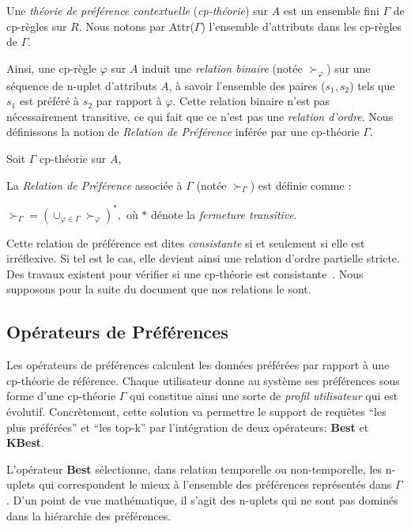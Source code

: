 Une \textit{théorie de préférence contextuelle} (\textit{cp-théorie}) sur $A$ est un ensemble fini $\Gamma$ de cp-règles sur $R$. Nous notons par Attr($\Gamma$) l'ensemble d'attributs dans les cp-règles de $\Gamma$.

Ainsi, une cp-règle $\varphi$ sur $A$ induit une \textit{relation binaire} (notée $\succ_\varphi$) sur une séquence de n-uplet d'attributs $A$, à savoir l'ensemble des paires ($s_1,s_2$) tels que $s_1$ est préféré à $s_2$ par rapport à $\varphi$. Cette relation binaire n'est pas nécessairement transitive, ce qui fait que ce n'est pas une \textit{relation d'ordre}. Nous définissons la notion de \textit{Relation de Préférence} inférée par une cp-théorie $\Gamma$.

\begin{defi}
Soit $\Gamma$ cp-théorie sur $A$,

La \textit{Relation de Préférence} associée à $\Gamma$ (notée $\succ_\Gamma$) est définie comme :
\begin{center} $\succ_\Gamma = (\cup_{\varphi \in \Gamma} \succ_\varphi)^*,$ o\`u $*$ dénote la \textit{fermeture transitive}.\end{center}
\end{defi}

Cette relation de préférence est dites \textit{consistante} si et seulement si elle est irréflexive. Si tel est le cas, elle devient ainsi une relation d'ordre partielle stricte. Des travaux existent pour vérifier si une cp-théorie est consistante~\cite{Wilson:cpnet}. Nous supposons pour la suite du document que nos relations le sont.

\subsection{Opérateurs de Préférences}
Les opérateurs de préférences calculent les données préférées par rapport à une cp-th\'eorie de référence. Chaque utilisateur donne au système ses préférences sous forme d'une cp-th\'eorie $\Gamma$ qui constitue ainsi une sorte de \textit{profil utilisateur} qui est évolutif. Concrètement, cette solution va permettre le support de requêtes 
\enquote{les plus préférées} et \enquote{les top-k} par l'intégration de deux opérateurs: \textbf{Best} et \textbf{KBest}.

L'opérateur \textbf{Best} sélectionne, dans relation temporelle ou non-temporelle, les n-uplets qui correspondent le mieux à l'ensemble des préférences représentés dans $\Gamma$. D'un point de vue mathématique, il s'agit des n-uplets qui ne sont pas dominés dans la hiérarchie des préférences.

